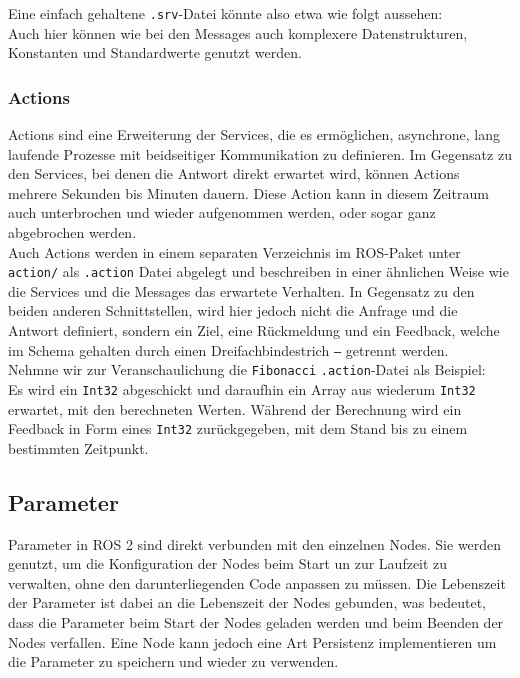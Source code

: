 \noindent
Eine einfach gehaltene \texttt{.srv}-Datei könnte also etwa wie folgt aussehen:\\
Auch hier können wie bei den Messages auch komplexere Datenstrukturen, Konstanten und Standardwerte genutzt werden.\\

\subsubsection{Actions}\label{subsubsec:ROS2Actions}
Actions sind eine Erweiterung der Services, die es ermöglichen, asynchrone, lang laufende Prozesse mit beidseitiger Kommunikation zu definieren. Im Gegensatz zu den Services, bei denen die Antwort direkt erwartet wird, können Actions mehrere Sekunden bis Minuten dauern. Diese Action kann in diesem Zeitraum auch unterbrochen und wieder aufgenommen werden, oder sogar ganz abgebrochen werden.
\\

\noindent
Auch Actions werden in einem separaten Verzeichnis im \ac{ROS}-Paket unter \texttt{action/} als \texttt{.action} Datei abgelegt und beschreiben in einer ähnlichen Weise wie die Services und die Messages das erwartete Verhalten. In Gegensatz zu den beiden anderen Schnittstellen, wird hier jedoch nicht die Anfrage und die Antwort definiert, sondern ein Ziel, eine Rückmeldung und ein Feedback, welche im Schema gehalten durch einen Dreifachbindestrich \texttt{---} getrennt werden.\\
Nehmne wir zur Veranschaulichung die \texttt{Fibonacci} \texttt{.action}-Datei als Beispiel:
\\

\noindent
{}
Es wird ein \texttt{Int32} abgeschickt und daraufhin ein Array aus wiederum \texttt{Int32} erwartet, mit den berechneten Werten. Während der Berechnung wird ein Feedback in Form eines \texttt{Int32} zurückgegeben, mit dem Stand bis zu einem bestimmten Zeitpunkt.\\


\subsection{Parameter}\label{subsec:ROS2Parameter}
Parameter in \ac{ROS} 2 sind direkt verbunden mit den einzelnen Nodes. Sie werden genutzt, um die Konfiguration der Nodes beim Start un zur Laufzeit zu verwalten, ohne den darunterliegenden Code anpassen zu müssen. Die Lebenszeit der Parameter ist dabei an die Lebenszeit der Nodes gebunden, was bedeutet, dass die Parameter beim Start der Nodes geladen werden und beim Beenden der Nodes verfallen. Eine Node kann jedoch eine Art Persistenz implementieren um die Parameter zu speichern und wieder zu verwenden.
\\

